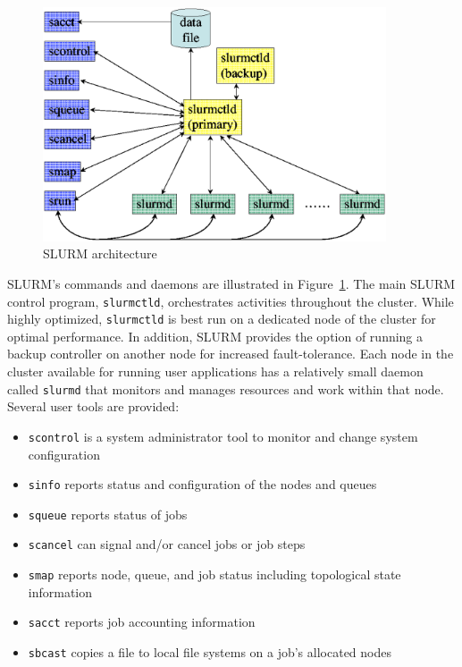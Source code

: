 \documentclass[10pt,onecolumn,times]{../common/llncs}
\begin{document}
{\begin{figure}[tb]
\centerline{\includegraphics[width=4in]{../figures/arch2.eps}}
\caption{\small SLURM architecture}
\label{arch}
\end{figure}

SLURM's commands and daemons are illustrated in Figure~\ref{arch}.
The main SLURM control program, {\tt slurmctld}, orchestrates
activities throughout the cluster. While highly optimized, 
{\tt slurmctld} is best run on a dedicated node of the cluster for optimal performance. 
In addition, SLURM provides the option of running  a backup controller 
on another node for increased fault-tolerance.
Each node in the cluster available for running user applications 
has a relatively small daemon called {\tt slurmd} that monitors
and manages resources and work within that node. 
Several user tools are provided:

\begin{itemize}
\item {\tt scontrol} is a system administrator tool to monitor and change
system configuration

\item {\tt sinfo} reports status and configuration of the nodes and queues

\item {\tt squeue} reports status of jobs

\item {\tt scancel} can signal and/or cancel jobs or job steps

\item {\tt smap} reports node, queue, and job status including 
topological state information

\item {\tt sacct} reports job accounting information

\item {\tt sbcast} copies a file to local file systems on a job's allocated nodes


\end{itemize}}
\end{document}
